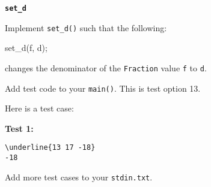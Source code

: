 \textbf{\texttt{set\_d}}

Implement \verb!set_d()! such that the following:
\begin{console}
set_d(f, d);
\end{console}
changes the denominator of the \verb!Fraction! value \verb!f! to \verb!d!.

Add test code to your \verb!main()!. This is test option 13.

Here is a test case:

\textbf{Test 1:}
\begin{Verbatim}[frame=single, commandchars=\\\{\}]
\underline{13 17 -18}
-18
\end{Verbatim}

Add more test cases to your \verb!stdin.txt!.
